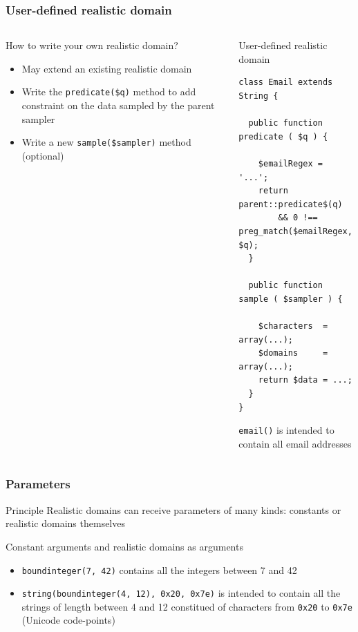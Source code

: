 \documentclass[9pt]{beamer}
\newcommand{\code}[1]{\texttt{#1}}
\begin{document}
\begin{frame}[fragile,t]
\frametitle{User-defined realistic domain}

\begin{columns}[t]

\begin{column}{.5\textwidth}
\begin{block}{How to write your own realistic domain?}
\begin{itemize}
\item May extend an existing realistic domain
\item Write the \code{predicate(\$q)} method to add constraint on the
data sampled by the parent sampler
\item Write a new \code{sample(\$sampler)} method (optional)
\end{itemize}
\end{block}
\end{column}

\begin{column}{.5\textwidth}
\begin{exampleblock}{User-defined realistic domain}
{
\scriptsize
\begin{verbatim}
class Email extends String {

  public function predicate ( $q ) {

    $emailRegex = '...';
    return parent::predicate$(q)
        && 0 !== preg_match($emailRegex, $q);
  }

  public function sample ( $sampler ) {

    $characters  = array(...);
    $domains     = array(...);
    return $data = ...;
  }
}
\end{verbatim}
}
\code{email()} is intended to contain all email addresses
\end{exampleblock}
\end{column}

\end{columns}

\end{frame}

\begin{frame}
\frametitle{Parameters}

\begin{block}{Principle}
Realistic domains can receive parameters of many kinds: constants or realistic
domains themselves
\end{block}

\begin{exampleblock}{Constant arguments and realistic domains as arguments}
\begin{itemize}
\item \code{boundinteger(7, 42)} contains all the integers between 7 and 42
\item \code{string(boundinteger(4, 12), 0x20, 0x7e)} is intended to contain all
the strings of length between 4 and 12 constitued of characters from \code{0x20}
to \code{0x7e} (Unicode code-points)
\end{itemize}
\end{exampleblock}

\end{frame}
\end{document}
